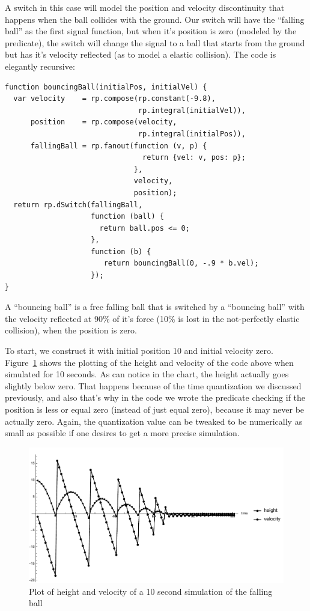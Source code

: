\documentclass[notitlepage]{article}
\begin{document}
A switch in this case will model the position and velocity discontinuity that
happens when the ball collides with the ground. Our switch will have the
``falling ball'' as the first signal function, but when it's position is zero
(modeled by the predicate), the switch will change the signal to a ball that
starts from the ground but has it's velocity reflected (as to model a elastic
collision). The code is elegantly recursive:

\begin{lstlisting}
function bouncingBall(initialPos, initialVel) {
  var velocity    = rp.compose(rp.constant(-9.8),
                               rp.integral(initialVel)),
      position    = rp.compose(velocity,
                               rp.integral(initialPos)),
      fallingBall = rp.fanout(function (v, p) {
                                return {vel: v, pos: p};
                              },
                              velocity,
                              position);
  return rp.dSwitch(fallingBall,
                    function (ball) {
                      return ball.pos <= 0;
                    },
                    function (b) {
                       return bouncingBall(0, -.9 * b.vel);
                    });
}
\end{lstlisting}

A ``bouncing ball'' is a free falling ball that is switched by a ``bouncing
ball'' with the velocity reflected at 90\% of it's force (10\% is lost in the
not-perfectly elastic collision), when the position is zero.

To start, we construct it with initial position 10 and initial velocity zero.
Figure~\ref{fig:bouncing-ball} shows the plotting of the height and velocity of
the code above when simulated for 10 seconds. As can notice in the chart, the
height actually goes slightly below zero. That happens because of the time
quantization we discussed previously, and also that's why in the code we wrote
the predicate checking if the position is less or equal zero (instead of just
equal zero), because it may never be actually zero. Again, the quantization
value can be tweaked to be numerically as small as possible if one desires to
get a more precise simulation.

\begin{figure}
    \centering
    \includegraphics[width=\linewidth,bb=0 0 482 256]{images/bouncing-ball.pdf}
    \caption{Plot of height and velocity of a 10 second simulation of the falling ball}
    \label{fig:bouncing-ball}
\end{figure}
\end{document}
